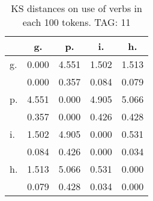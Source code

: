 \begin{table}[h!]
\begin{center}
\begin{tabular}{| l | c | c | c | c |}\hline
 & g. & p. & i. & h. \\\hline
g. & 0.000  & 4.551  & 1.502  & 1.513 \\\hline
 & 0.000  & 0.357  & 0.084  & 0.079 \\\hline
p. & 4.551  & 0.000  & 4.905  & 5.066 \\\hline
 & 0.357  & 0.000  & 0.426  & 0.428 \\\hline
i. & 1.502  & 4.905  & 0.000  & 0.531 \\\hline
 & 0.084  & 0.426  & 0.000  & 0.034 \\\hline
h. & 1.513  & 5.066  & 0.531  & 0.000 \\\hline
 & 0.079  & 0.428  & 0.034  & 0.000 \\\hline
\end{tabular}
\caption{KS distances on use of verbs in each 100 tokens. TAG: 11}
\end{center}
\end{table}